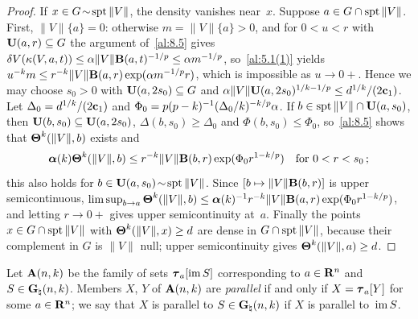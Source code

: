 \begin{proof}
    If $x \in G \!\sim\! \operatorname{spt} \|V\|$, the density vanishes near~$x$. Suppose $a \in G \cap \operatorname{spt}
    \|V\|$. First, $\|V\| \{ a \} = 0$: otherwise $m = \|V\| \{ a \} > 0$, and for $0 < u < r$ with
    $\mathbf{U}(a,r) \subseteq G$ the argument of~\ref{al:8.5} gives $\delta V(\kappa(V,a,t)) \le
    \alpha \|V\| \mathbf{B}(a,t)^{-1/p} \le \alpha m^{-1/p}$, so~\ref{al:5.1(1)} yields $u^{-k} m
    \le r^{-k} \|V\| \mathbf{B}(a,r) \exp(\alpha m^{-1/p} r)$, which is impossible as $u \to 0+$.
    Hence we may choose $s_0 > 0$ with $\mathbf{U}(a,2 s_0) \subseteq G$ and $\alpha \|V\| \mathbf{U}(a,2
    s_0)^{1/k - 1/p} \le d^{1/k}/(2 \mathbf{c}_1)$. Let $\Delta_0 = d^{1/k} / (2
    \mathbf{c}_1)$ and $\Phi_0 = p (p - k)^{-1} (\Delta_0/k)^{-k/p} \alpha$. If $b \in
    \operatorname{spt} \|V\| \cap \mathbf{U}(a,s_0)$, then $\mathbf{U}(b,s_0) \subseteq \mathbf{U}(a,2 s_0)$,
    $\Delta(b,s_0) \ge \Delta_0$ and $\Phi(b,s_0) \le \Phi_0$, so~\ref{al:8.5} shows that
    $\boldsymbol{\Theta}^{k}(\|V\|,b)$ exists and
    \begin{displaymath}
        \boldsymbol{\alpha}(k) \boldsymbol{\Theta}^{k}(\|V\|,b) \le r^{-k} \|V\| \mathbf{B}(b,r) \exp(\Phi_0
        r^{1-k/p}) \quad \text{for $0 < r < s_0$} \,;
    \end{displaymath}
    this also holds for $b \in \mathbf{U}(a,s_0) \!\sim\! \operatorname{spt} \|V\|$. Since $[b \mapsto \|V\|
    \mathbf{B}(b,r)]$ is upper semicontinuous, $\limsup_{b \to a} \boldsymbol{\Theta}^{k}(\|V\|,b) \le
    \boldsymbol{\alpha}(k)^{-1} r^{-k} \|V\| \mathbf{B}(a,r) \exp(\Phi_0 r^{1-k/p})$, and letting
    $r \to 0+$ gives upper semicontinuity at~$a$. Finally the points $x \in G \cap \operatorname{spt} \|V\|$ with
    $\boldsymbol{\Theta}^{k}(\|V\|,x) \ge d$ are dense in $G \cap \operatorname{spt} \|V\|$, because their complement in $G$
    is $\|V\|$ null; upper semicontinuity gives $\boldsymbol{\Theta}^{k}(\|V\|,a) \ge d$.
\end{proof}

\begin{definition}
    \label{al:8.7}
    Let $\mathbf{A}(n,k)$ be the family of sets $\boldsymbol{\tau}_{a}[\operatorname{im} S]$ corresponding to $a \in
    \mathbf{R}^{n}$ and $S \in \mathbf{G}_{\natural}(n,k)$. Members $X$, $Y$ of $\mathbf{A}(n,k)$ are
    \emph{parallel} if and only if $X = \boldsymbol{\tau}_{a}[Y]$ for some $a \in \mathbf{R}^{n}$; we say that $X$ is
    parallel to $S \in \mathbf{G}_{\natural}(n,k)$ if $X$ is parallel to~$\operatorname{im} S$.
\end{definition}

